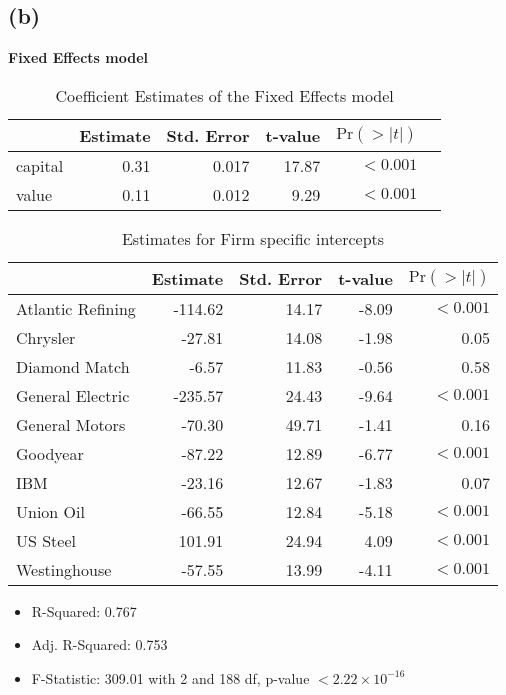 \documentclass[a4paper]{article}
\begin{document}
\subsection*{(b)}
\textbf{Fixed Effects model}
\begin{table}[ht]
    \centering
    \begin{tabular}{@{}lrrrrr@{}}
        \toprule
                & Estimate  & Std. Error  & t-value & \(\text{Pr}(>|t|)\)\\
                \midrule
        capital   & 0.31   & 0.017 & 17.87  & \(<0.001\)\\
        value     & 0.11   & 0.012 & 9.29 & \(<0.001\)\\
        \bottomrule
    \end{tabular}
    \caption{Coefficient Estimates of the Fixed Effects model}
\end{table}

\begin{table}[ht]
    \centering
    \begin{tabular}{lrrrr}
    \toprule
     & {Estimate} & {Std. Error} & {t-value} & \(\text{Pr}(>|t|)\) \\ \midrule
    Atlantic Refining   & -114.62 & 14.17 & -8.09  & $<0.001$ \\ 
    Chrysler            & -27.81  & 14.08 & -1.98  & 0.05  \\ 
    Diamond Match       & -6.57   & 11.83 & -0.56  & 0.58 \\ 
    General Electric    & -235.57 & 24.43 & -9.64  & $<0.001$ \\ 
    General Motors      & -70.30  & 49.71 & -1.41  & 0.16 \\ 
    Goodyear            & -87.22  & 12.89 & -6.77  & $<0.001$ \\ 
    IBM                 & -23.16  & 12.67 & -1.83  & 0.07  \\ 
    Union Oil           & -66.55  & 12.84 & -5.18  & $<0.001$  \\ 
    US Steel            & 101.91  & 24.94 & 4.09   & $<0.001$  \\ 
    Westinghouse        & -57.55  & 13.99 & -4.11  & $<0.001$  \\
    \bottomrule
    \end{tabular}
    \caption{Estimates for Firm specific intercepts}
\end{table}
    
\begin{itemize}
    \item R-Squared: 0.767
    \item Adj. R-Squared: 0.753
    \item F-Statistic: 309.01 with 2 and 188 df, p-value \(<2.22 \times 10^{-16}\) 
\end{itemize}
\end{document}
